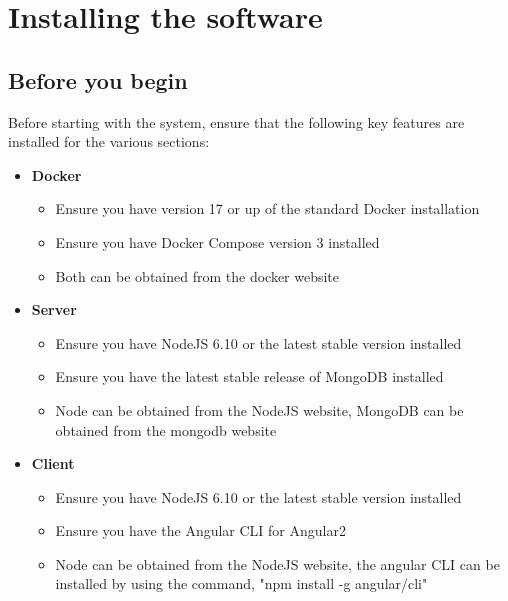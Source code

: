 \documentclass[a4paper,12pt]{article}
\begin{document}
  	\pagebreak
  	
    \section{Installing the software}

    	\subsection{Before you begin}
    	
    	Before starting with the system, ensure that the following key features are installed for the various sections:
    	
    	\begin{itemize}
    		\item \textbf{Docker}
    		\begin{itemize}
    			\item Ensure you have version 17 or up of the standard Docker installation
    			\item Ensure you have Docker Compose version 3 installed
    			\item Both can be obtained from the docker website
    		\end{itemize}
    	\end{itemize}
    
    	\begin{itemize}
	    	\item \textbf{Server}
	    	\begin{itemize}
	    		\item Ensure you have NodeJS 6.10 or the latest stable version installed
	    		\item Ensure you have the latest stable release of MongoDB installed
	    		\item Node can be obtained from the NodeJS website, MongoDB can be obtained from the mongodb website
	    	\end{itemize}
    	\end{itemize}
    
       	\begin{itemize}
	    	\item \textbf{Client}
	    	\begin{itemize}
    			\item Ensure you have NodeJS 6.10 or the latest stable version installed
    			\item Ensure you have the Angular CLI for Angular2
	    		\item Node can be obtained from the NodeJS website, the angular CLI can be installed by using the command, "npm install -g angular/cli" 
	    	\end{itemize}
    	\end{itemize}
   	
\end{document}
